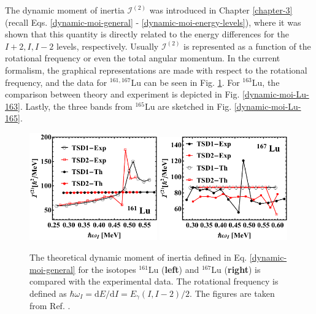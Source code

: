 The dynamic moment of inertia $\mathcal{I}^{(2)}$ was introduced in Chapter \ref{chapter-3} (recall Eqs. \ref{dynamic-moi-general} - \ref{dynamic-moi-energy-levels}), where it was shown that this quantity is directly related to the energy differences for the $I+2,I,I-2$ levels, respectively. Usually $\mathcal{I}^{(2)}$ is represented as a function of the rotational frequency or even the total angular momentum. In the current formalism, the graphical representations are made with respect to the rotational frequency, and the data for $^{161,167}$Lu can be seen in Fig. \ref{dynamic-moi-Lu-161-167}. For $^{163}$Lu, the comparison between theory and experiment is depicted in Fig. \ref{dynamic-moi-Lu-163}. Lastly, the three bands from $^{165}$Lu are sketched in Fig. \ref{dynamic-moi-Lu-165}.
\begin{figure}
    \centering
    \includegraphics[width=0.49\textwidth]{Chapters/Figures/Lu-exp-energies/fig15_lu161.pdf}
    \includegraphics[width=0.49\textwidth]{Chapters/Figures/Lu-exp-energies/fig18_lu167.pdf}
    \caption{The theoretical dynamic moment of inertia defined in Eq. \ref{dynamic-moi-general} for the isotopes $^{161}$Lu (\textbf{left}) and $^{167}$Lu (\textbf{right}) is compared with the experimental data. The rotational frequency is defined as $\hbar\omega_I=\text{d}E/\text{d}I=E_\gamma(I,I-2)/2$. The figures are taken from Ref. \cite{raduta2020approach}.}
    \label{dynamic-moi-Lu-161-167}
\end{figure}
